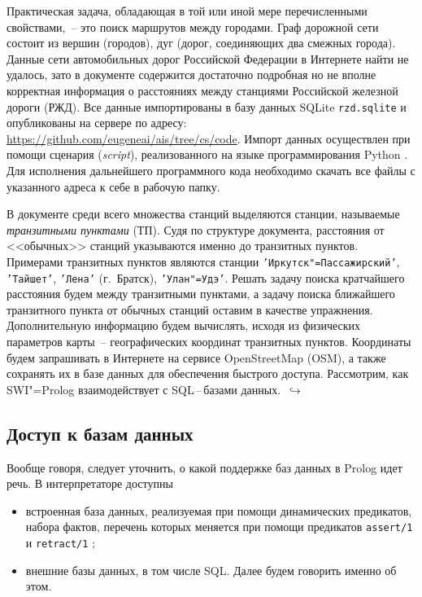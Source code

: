 \documentclass[a4paper,14pt, openany, twoside, final]{extbook} %
\newcommand{\eeng}[1]{\emph{\foreignlanguage{english}{#1}}}
\newcommand{\nnn}[2][ncolor]{\noindent%
\textcolor{eclr}{!\ [}\textcolor{#1}{#2}\textcolor{eclr}{]}}
\newcommand{\goforth}[1]{$\,\hookrightarrow$\pageref{#1}}
\begin{document}

Практическая задача, обладающая в той или иной мере перечисленными свойствами,~-- это поиск маршрутов между городами.  Граф дорожной сети состоит из вершин (городов), дуг (дорог, соединяющих два смежных города).  Данные сети автомобильных дорог Российской Федерации в Интернете найти не удалось, зато в документе \cite{rzhddb} содержится достаточно подробная но не вполне корректная информация о расстояниях между станциями Российской железной дороги (РЖД).  Все данные импортированы в базу данных SQLite \cite{sqlite} \texttt{rzd.sqlite} и опубликованы на сервере по адресу: \url{https://github.com/eugeneai/ais/tree/cs/code}.  Импорт данных осуществлен при помощи сценария (\eeng{script}), реализованного на языке программирования Python \cite{pythondoc,pythondl,pythonbook}.  Для исполнения дальнейшего программного кода необходимо скачать все файлы с указанного адреса к себе в рабочую папку.

В документе \cite{rzhddb} среди всего множества станций выделяются станции, называемые \emph{транзитными пунктами} (ТП).  Судя по структуре документа, расстояния от <<обычных>> станций указываются именно до транзитных пунктов.  Примерами транзитных пунктов являются станции \texttt{'Иркутск"=Пассажирский'}, \texttt{'Тайшет'}, \texttt{'Лена'} (г.~Братск), \texttt{'Улан"=Удэ'}.  Решать задачу поиска кратчайшего расстояния будем между транзитными пунктами, а задачу поиска ближайшего транзитного пункта от обычных станций оставим в качестве упражнения.  Дополнительную информацию будем вычислять, исходя из физических параметров карты~-- географических координат транзитных пунктов.  Координаты будем запрашивать в Интернете на сервисе \foreignlanguage{english}{Open\-Street\-Map} (OSM), а также сохранять их в базе данных для обеспечения быстрого доступа.  Рассмотрим, как SWI"=Pro\-log взаимодействует с SQL\,--\,ба\-за\-ми данных. \goforth{par:informedcont}

\subsection{Доступ к базам данных}
\label{sec:dbms}

Вообще говоря, следует уточнить, о какой поддержке баз данных в Prolog идет речь.  В интерпретаторе доступны
\begin{itemize}
\item встроенная база данных, реализуемая при помощи динамических предикатов, набора фактов, перечень которых меняется при помощи предикатов \texttt{assert/1} и \texttt{retract/1} \cite{Bratko};
\item внешние базы данных, в том числе SQL.  Далее будем говорить именно об этом.
\end{itemize}
\end{document}
